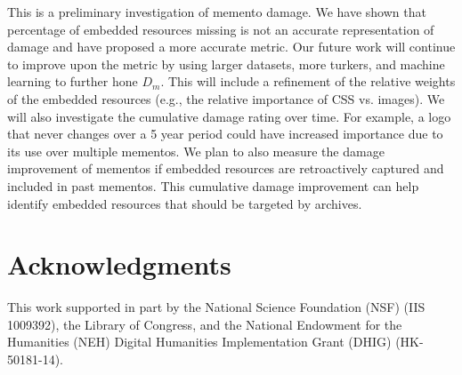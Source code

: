 This is a preliminary investigation of memento damage. We have shown that percentage of embedded resources missing is not an accurate representation of damage and have proposed a more accurate metric.  Our future work will continue to improve upon the metric by using larger datasets, more turkers, and machine learning to further hone $D_m$. This will include a refinement of the relative weights of the embedded resources (e.g., the relative importance of CSS vs. images). We will also investigate the cumulative damage rating over time. For example, a logo that never changes over a 5 year period could have increased importance due to its use over multiple mementos. We plan to also measure the damage improvement of mementos if embedded resources are retroactively captured and included in past mementos. This cumulative damage improvement can help identify embedded resources that should be targeted by archives.



\section{Acknowledgments}
This work supported in part by the National Science Foundation (NSF) (IIS 1009392), the Library of Congress, and the National Endowment for the Humanities (NEH) Digital Humanities Implementation Grant (DHIG) (HK-50181-14).


%

 
%  







